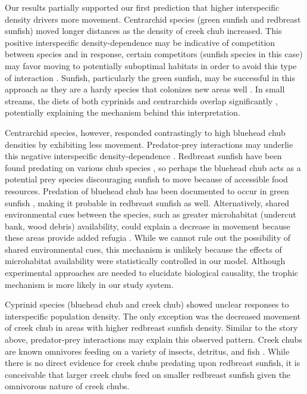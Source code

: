 \documentclass[11pt, class=article, crop=false]{standalone}
\begin{document}
Our results partially supported our first prediction that higher interspecific density drivers more movement. Centrarchid species (green sunfish and redbreast sunfish) moved longer distances as the density of creek chub increased. This positive interspecific density-dependence may be indicative of competition between species and in response, certain competitors (sunfish species in this case) may favor moving to potentially suboptimal habitats in order to avoid this type of interaction \citep{jacobHabitatChoiceMeets2018, thierryInterplayAbioticBiotic2024}. Sunfish, particularly the green sunfish, may be successful in this approach as they are a hardy species that colonizes new areas well \citep{lemlySuppressionNativeFish1985, moyleInlandFishesCalifornia2002}. In small streams, the diets of both cyprinids and centrarchids overlap significantly \citep{collarPISCIVORYLIMITSDIVERSIFICATION2009, lemlySuppressionNativeFish1985, karrAssessmentBioticIntegrity1981, leonardApplicationTestingIndex1986}, potentially explaining the mechanism behind this interpretation.  

Centrarchid species, however, responded contrastingly to high bluehead chub densities by exhibiting less movement. Predator-prey interactions may underlie this negative interspecific density-dependence \citep{jacobHabitatMatchingSpatial2015}. Redbreast sunfish have been found predating on various chub species \citep{borrelliPuttingLakeTogether2023}, so perhaps the bluehead chub acts as a potential prey species discouraging sunfish to move because of accessible food resources. Predation of bluehead chub has been documented to occur in green sunfish \citep{lemlySuppressionNativeFish1985}, making it probable in redbreast sunfish as well. Alternatively, shared environmental cues between the species, such as greater microhabitat (undercut bank, wood debris) availability, could explain a decrease in movement because these areas provide added refugia \citep{careyEffectsLittoralHabitat2010}. While we cannot rule out the possibility of shared environmental cues, this mechanism is unlikely because the effects of microhabitat availability were statistically controlled in our model. Although experimental approaches are needed to elucidate biological causality, the trophic mechanism is more likely in our study system. 

Cyprinid species (bluehead chub and creek chub) showed unclear responses to interspecific population density. The only exception was the decreased movement of creek chub in areas with higher redbreast sunfish density. Similar to the story above, predator-prey interactions may explain this observed pattern. Creek chubs are known omnivores feeding on a variety of insects, detritus, and fish \citep{champagneRiparianBuffersMaintain2022, leonardApplicationTestingIndex1986, quistSummerFoodHabits2006}. While there is no direct evidence for creek chubs predating upon redbreast sunfish, it is conceivable that larger creek chubs feed on smaller redbreast sunfish given the omnivorous nature of creek chubs.
\end{document}
